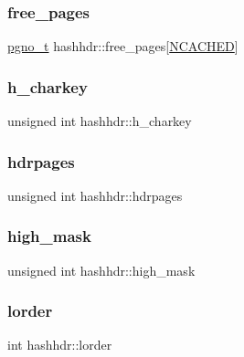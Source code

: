 \mbox{\label{structhashhdr_a38a1ac0b707e43ac445253101f0f510b}} 
\subsubsection{\texorpdfstring{free\_pages}{free\_pages}}
{\footnotesize\ttfamily \mbox{\hyperlink{other__libs_2filedb_2filehash_2ffdb__db_8h_a000813331643d38481142bcce7de1501}{pgno\+\_\+t}} hashhdr\+::free\+\_\+pages\mbox{[}\mbox{\hyperlink{ffdb__hash_8h_a2a0096aff8f4e93a03a33f31917b4067}{N\+C\+A\+C\+H\+ED}}\mbox{]}}

\mbox{\label{structhashhdr_a5af866b3ffa5d9130692987e0d1d6439}} 
\subsubsection{\texorpdfstring{h\_charkey}{h\_charkey}}
{\footnotesize\ttfamily unsigned int hashhdr\+::h\+\_\+charkey}

\mbox{\label{structhashhdr_ac406338d778bc3cf51b86577076b0f54}} 
\subsubsection{\texorpdfstring{hdrpages}{hdrpages}}
{\footnotesize\ttfamily unsigned int hashhdr\+::hdrpages}

\mbox{\label{structhashhdr_a0af934c1fbbd9d4e806a7dfd60eeaee6}} 
\subsubsection{\texorpdfstring{high\_mask}{high\_mask}}
{\footnotesize\ttfamily unsigned int hashhdr\+::high\+\_\+mask}

\mbox{\label{structhashhdr_a4c62299ebefbc6685770b2c48e85e5f7}} 
\subsubsection{\texorpdfstring{lorder}{lorder}}
{\footnotesize\ttfamily int hashhdr\+::lorder}

